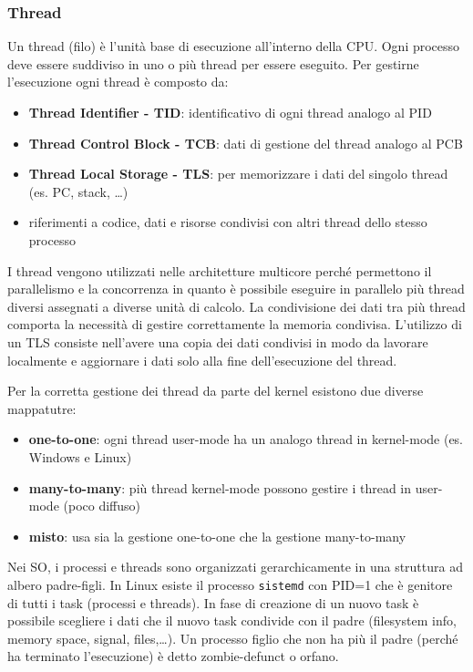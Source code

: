 \documentclass[a4paper]{article}
\begin{document}
\subsubsection*{Thread}
Un thread (filo) è l'unità base di esecuzione all'interno della CPU. Ogni processo deve essere suddiviso in uno o più thread per
essere eseguito. Per gestirne l'esecuzione ogni thread è composto da:
\begin{itemize}
	\item \textbf{Thread Identifier - TID}: identificativo di ogni thread analogo al PID
	\item \textbf{Thread Control Block - TCB}: dati di gestione del thread analogo al PCB
	\item \textbf{Thread Local Storage - TLS}: per memorizzare i dati del singolo thread (es. PC, stack, \dots)
	\item riferimenti a codice, dati e risorse condivisi con altri thread dello stesso processo
\end{itemize}
I thread vengono utilizzati nelle architetture multicore perché permettono il parallelismo e la concorrenza in quanto è possibile
eseguire in parallelo più thread diversi assegnati a diverse unità di calcolo. La condivisione dei dati tra più thread comporta
la necessità di gestire correttamente la memoria condivisa. L'utilizzo di un TLS consiste nell'avere una copia dei dati condivisi
in modo da lavorare localmente e aggiornare i dati solo alla fine dell'esecuzione del thread.

Per la corretta gestione dei thread da parte del kernel esistono due diverse mappatutre:
\begin{itemize}
	\item \textbf{one-to-one}: ogni thread user-mode ha un analogo thread in kernel-mode (es. Windows e Linux)
	\item \textbf{many-to-many}: più thread kernel-mode possono gestire i thread in user-mode (poco diffuso)
	\item \textbf{misto}: usa sia la gestione one-to-one che la gestione many-to-many
\end{itemize}

Nei SO, i processi e threads sono organizzati gerarchicamente in una struttura ad albero padre-figli. In Linux esiste il processo
\verb|sistemd| con PID=1 che è genitore di tutti i task (processi e threads). In fase di creazione di un nuovo task è possibile 
scegliere i dati che il nuovo task condivide con il padre (filesystem info, memory space, signal, files,\dots). Un processo figlio
che non ha più il padre (perché ha terminato l'esecuzione) è detto zombie-defunct o orfano.
\end{document}
